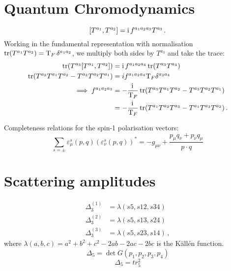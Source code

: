 \documentclass[main.tex]{subfiles}
\begin{document}
\section{Quantum Chromodynamics} \label{sec:QCD}
\begin{equation} \label{eq:liealgebra}
    [T^{a_1}, T^{a_2}] = \mathrm{i}\, f^{a_1a_2a_3} T^{a_3} \,.
\end{equation}
Working in the fundamental representation with normalisation $\operatorname{\rm tr}(T^{a_1} T^{a_2}) = \mathrm{T}_F \, \delta^{a_1a_2}$, we multiply both sides by $T^{a_3}$ and take the trace:
\begin{align} \label{eq:f(abc)}
    \operatorname{\rm tr}(T^{a_3}[T^{a_1}, T^{a_2}]) &= \mathrm{i}\, f^{a_1a_2a_4} \operatorname{\rm tr}(T^{a_3} T^{a_4}) \nonumber \\
    \operatorname{\rm tr}(T^{a_3} T^{a_1} T^{a_2} - T^{a_3} T^{a_2} T^{a_1}) &= if^{a_1a_2a_4} \mathrm{T}_F \delta^{a_3a_4} \nonumber \\ 
    \implies f^{a_1a_2a_3} &= -\frac{\mathrm{i}\,}{\mathrm{T}_F} \operatorname{\rm tr}(T^{a_3} T^{a_1} T^{a_2} - T^{a_3} T^{a_2} T^{a_1}) \nonumber \\
    &= -\frac{\mathrm{i}\,}{\mathrm{T}_F} \operatorname{\rm tr}(T^{a_1} T^{a_2} T^{a_3} - T^{a_1}T^{a_3} T^{a_2}) \,.
\end{align}

Completeness relations for the spin-1 polarisation vectors:
\begin{equation} \label{eq:completeness:bosons}
    \sum_{s=\pm} \varepsilon_\mu^s(p, q) (\varepsilon_\nu^s(p, q))^{\ast} = -g_{\mu\nu} + \frac{p_\mu q_\nu + p_\nu q_\mu}{p \cdot q}
\end{equation}

\section{Scattering amplitudes}
\begin{align} \label{eq:delta3}
    \Delta_3^{(1)} &= \lambda(s5, s12, s34) \nonumber \\
    \Delta_3^{(2)} &= \lambda(s5, s13, s24) \nonumber \\
    \Delta_3^{(3)} &= \lambda(s5, s23, s14)\,,
\end{align}
where $\lambda(a,b,c) = a^2+b^2+c^2 - 2ab-2ac-2bc$ is the Källén function.
\begin{equation} \label{eq:delta5}
    \Delta_5 = \det G(p_1, p_2, p_3, p_4)
\end{equation}
\begin{equation} \label{eq:delta5tr5}
    \Delta_5 = tr_5^2
\end{equation}
\end{document}
